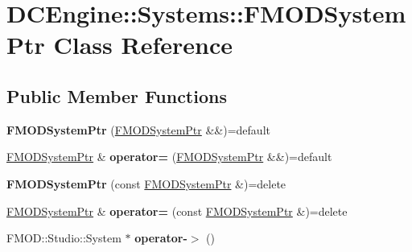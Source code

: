 \hypertarget{classDCEngine_1_1Systems_1_1FMODSystemPtr}{\section{D\-C\-Engine\-:\-:Systems\-:\-:F\-M\-O\-D\-System\-Ptr Class Reference}
\label{classDCEngine_1_1Systems_1_1FMODSystemPtr}
}
\subsection*{Public Member Functions}
\begin{DoxyCompactItemize}
\item 
\hypertarget{classDCEngine_1_1Systems_1_1FMODSystemPtr_a2259928216c324611369c010c4daf08f}{{\bfseries F\-M\-O\-D\-System\-Ptr} (\hyperlink{classDCEngine_1_1Systems_1_1FMODSystemPtr}{F\-M\-O\-D\-System\-Ptr} \&\&)=default}\label{classDCEngine_1_1Systems_1_1FMODSystemPtr_a2259928216c324611369c010c4daf08f}

\item 
\hypertarget{classDCEngine_1_1Systems_1_1FMODSystemPtr_a79205f7786e969591593dfdd72c8899f}{\hyperlink{classDCEngine_1_1Systems_1_1FMODSystemPtr}{F\-M\-O\-D\-System\-Ptr} \& {\bfseries operator=} (\hyperlink{classDCEngine_1_1Systems_1_1FMODSystemPtr}{F\-M\-O\-D\-System\-Ptr} \&\&)=default}\label{classDCEngine_1_1Systems_1_1FMODSystemPtr_a79205f7786e969591593dfdd72c8899f}

\item 
\hypertarget{classDCEngine_1_1Systems_1_1FMODSystemPtr_a55f2f97351c71415e9fc14093a32dfbd}{{\bfseries F\-M\-O\-D\-System\-Ptr} (const \hyperlink{classDCEngine_1_1Systems_1_1FMODSystemPtr}{F\-M\-O\-D\-System\-Ptr} \&)=delete}\label{classDCEngine_1_1Systems_1_1FMODSystemPtr_a55f2f97351c71415e9fc14093a32dfbd}

\item 
\hypertarget{classDCEngine_1_1Systems_1_1FMODSystemPtr_ab56ca17be35ff4494dd4bed80367fd0c}{\hyperlink{classDCEngine_1_1Systems_1_1FMODSystemPtr}{F\-M\-O\-D\-System\-Ptr} \& {\bfseries operator=} (const \hyperlink{classDCEngine_1_1Systems_1_1FMODSystemPtr}{F\-M\-O\-D\-System\-Ptr} \&)=delete}\label{classDCEngine_1_1Systems_1_1FMODSystemPtr_ab56ca17be35ff4494dd4bed80367fd0c}

\item 
\hypertarget{classDCEngine_1_1Systems_1_1FMODSystemPtr_aba95c68ba4ed432877c7fcd5dfd3a3d2}{F\-M\-O\-D\-::\-Studio\-::\-System $\ast$ {\bfseries operator-\/$>$} ()}\label{classDCEngine_1_1Systems_1_1FMODSystemPtr_aba95c68ba4ed432877c7fcd5dfd3a3d2}

\end{DoxyCompactItemize}
